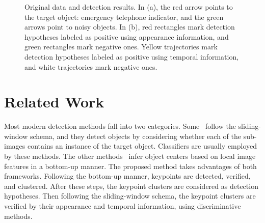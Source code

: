 \begin{figure}
\centering
{}
\caption[Target objects and detection results]{Original data and detection results. In (a), the red arrow points to the target object: emergency telephone indicator, and the green arrows point to noisy objects. In (b), red rectangles mark detection hypotheses labeled as positive using appearance information, and green rectangles mark negative ones. Yellow trajectories mark detection hypotheses labeled as positive using temporal information, and white trajectories mark negative ones.
}
\label{fig:first}
\end{figure}









\section{Related Work}
\label{rw}


Most modern detection methods fall into two categories. Some~\citep{ij4,ac31,ac30,ac4,ac32,ac29,ac28,ac1} follow the sliding-window schema, and they detect objects by considering whether each of the sub-images contains an instance of the target object. Classifiers are usually employed by these methods. The other methods~\citep{ac9,ac2,ac3,ac5,ac10,ac21,ac18} infer object centers based on local image features in a bottom-up manner. The proposed method takes advantages of both frameworks. Following the bottom-up manner, keypoints are detected, verified, and clustered. After these steps, the keypoint clusters are considered as detection hypotheses. Then following the sliding-window schema, the keypoint clusters are verified by their appearance and temporal information, using discriminative methods.

